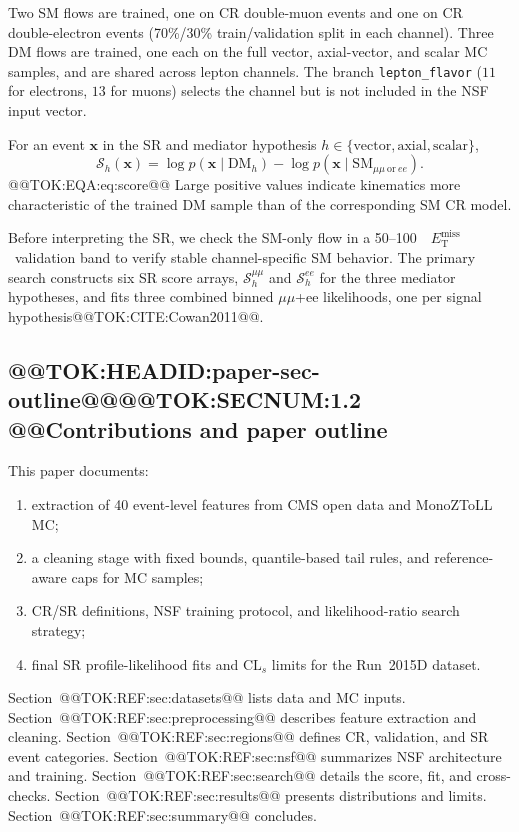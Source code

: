 \documentclass[11pt]{article}
\newcommand{\GeV}{\text{GeV}}
\newcommand{\MET}{\ensuremath{E_{\mathrm{T}}^{\mathrm{miss}}}}
\newcommand{\score}{\ensuremath{\mathcal{S}}}
\begin{document}
Two SM flows are trained, one on CR double-muon events and one on CR double-electron events
(70\%/30\% train/validation split in each channel).
Three DM flows are trained, one each on the full vector, axial-vector, and scalar MC
samples, and are shared across lepton channels.
The branch \texttt{lepton\_flavor} ($11$ for electrons, $13$ for muons) selects the channel
but is not included in the NSF input vector.

For an event $\mathbf{x}$ in the SR and mediator hypothesis
$h\in\{\mathrm{vector},\mathrm{axial},\mathrm{scalar}\}$,
\begin{equation}
  \score_h(\mathbf{x}) =
  \log p(\mathbf{x}\mid\mathrm{DM}_h) -
  \log p(\mathbf{x}\mid\mathrm{SM}_{\mu\mu\ \mathrm{or}\ ee}).
  
\end{equation}@@TOK:EQA:eq:score@@
Large positive values indicate kinematics more characteristic of the trained DM sample
than of the corresponding SM CR model.

Before interpreting the SR, we check the SM-only flow in a 50--100~\GeV\ \MET\
validation band to verify stable channel-specific SM behavior. The primary search
constructs six SR score arrays, $\score_h^{\mu\mu}$ and $\score_h^{ee}$ for the
three mediator hypotheses, and fits three combined binned $\mu\mu$+ee likelihoods,
one per signal hypothesis@@TOK:CITE:Cowan2011@@.

\subsection{@@TOK:HEADID:paper-sec-outline@@@@TOK:SECNUM:1.2 @@Contributions and paper outline}

This paper documents:
\begin{enumerate}
  \item extraction of 40 event-level features from CMS open data and MonoZToLL MC;
  \item a cleaning stage with fixed bounds, quantile-based tail rules, and reference-aware
        caps for MC samples;
  \item CR/SR definitions, NSF training protocol, and likelihood-ratio search strategy;
  \item final SR profile-likelihood fits and $\mathrm{CL}_{s}$ limits for the Run~2015D dataset.
\end{enumerate}

Section~@@TOK:REF:sec:datasets@@ lists data and MC inputs.
Section~@@TOK:REF:sec:preprocessing@@ describes feature extraction and cleaning.
Section~@@TOK:REF:sec:regions@@ defines CR, validation, and SR event categories.
Section~@@TOK:REF:sec:nsf@@ summarizes NSF architecture and training.
Section~@@TOK:REF:sec:search@@ details the score, fit, and cross-checks.
Section~@@TOK:REF:sec:results@@ presents distributions and limits.
Section~@@TOK:REF:sec:summary@@ concludes.
\end{document}
